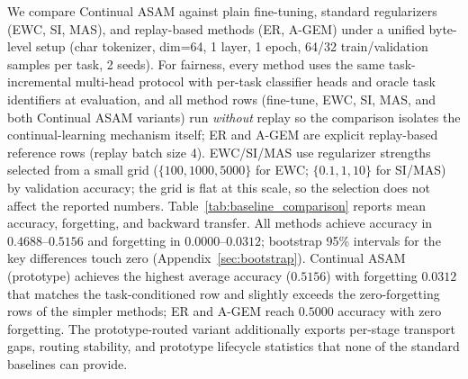\documentclass[11pt,a4paper]{article}
\theoremstyle{definition}
\begin{document}
We compare Continual ASAM against plain fine-tuning, standard regularizers (EWC, SI, MAS), and replay-based methods (ER, A-GEM) under a unified byte-level setup (char tokenizer, dim=64, 1 layer, 1 epoch, 64/32 train/validation samples per task, 2 seeds). For fairness, every method uses the same task-incremental multi-head protocol with per-task classifier heads and oracle task identifiers at evaluation, and all method rows (fine-tune, EWC, SI, MAS, and both Continual ASAM variants) run \emph{without} replay so the comparison isolates the continual-learning mechanism itself; ER and A-GEM are explicit replay-based reference rows (replay batch size 4). EWC/SI/MAS use regularizer strengths selected from a small grid ($\{100,1000,5000\}$ for EWC; $\{0.1,1,10\}$ for SI/MAS) by validation accuracy; the grid is flat at this scale, so the selection does not affect the reported numbers. Table~\ref{tab:baseline_comparison} reports mean accuracy, forgetting, and backward transfer. All methods achieve accuracy in $0.4688$--$0.5156$ and forgetting in $0.0000$--$0.0312$; bootstrap 95\% intervals for the key differences touch zero (Appendix~\ref{sec:bootstrap}). Continual ASAM (prototype) achieves the highest average accuracy ($0.5156$) with forgetting $0.0312$ that matches the task-conditioned row and slightly exceeds the zero-forgetting rows of the simpler methods; ER and A-GEM reach $0.5000$ accuracy with zero forgetting. The prototype-routed variant additionally exports per-stage transport gaps, routing stability, and prototype lifecycle statistics that none of the standard baselines can provide.
\end{document}
